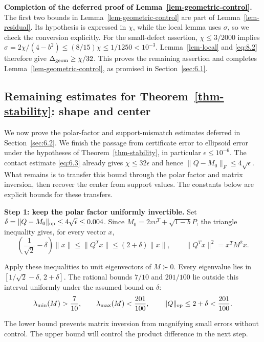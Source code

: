 \textbf{Completion of the deferred proof of Lemma~\ref{lem-geometric-control}.} The first two bounds in Lemma~\ref{lem-geometric-control}
are part of Lemma~\ref{lem-residual}. Its hypothesis is expressed in $\chi$, while the local
lemma uses $\sigma$, so we check the conversion explicitly. For the small-defect
assertion, $\chi\le3/2000$ implies
$\sigma=2\chi/(4-b^2)\le(8/15)\chi\le1/1250<10^{-3}$.
Lemma~\ref{lem-local} and \eqref{eq:8.2} therefore give $\Delta_{\rm geom}\ge\chi/32$.
This proves the remaining assertion and completes Lemma~\ref{lem-geometric-control}, as promised in Section~\ref{sec:6.1}.

\subsection{Remaining estimates for Theorem~\ref{thm-stability}: shape and center}\label{sec:9.4}

We now prove the polar-factor and support-mismatch estimates deferred in
Section~\ref{sec:6.2}. We finish the passage from certificate error to ellipsoid error under the
hypotheses of Theorem~\ref{thm-stability}, in particular $\epsilon\le10^{-6}$.
The contact estimate \eqref{eq:6.3} already gives $\chi\le32\epsilon$ and hence
$\|Q-M_0\|_F\le4\sqrt\epsilon$. What remains is to transfer this bound through
the polar factor and matrix inversion, then recover the center from support
values. The constants below are explicit bounds for these transfers.

\textbf{Step 1: keep the polar factor uniformly invertible.} Set
$\delta=\|Q-M_0\|_{\rm op}\le4\sqrt\epsilon\le0.004$. Since
$M_0=2vv^T+\sqrt{1-b}P$, the triangle inequality gives, for every vector $x$,
\begin{equation}\label{eq:9.14}
\left(\frac1{\sqrt2}-\delta\right)\|x\|
\le\|Q^Tx\|\le(2+\delta)\|x\|,
\qquad
\|Q^Tx\|^2=x^TM^2x.
\end{equation}

Apply these inequalities to unit eigenvectors of $M\succ0$. Every eigenvalue
lies in $[1/\sqrt2-\delta,\,2+\delta]$.
The rational bounds $7/10$ and $201/100$ lie outside this interval uniformly
under the assumed bound on $\delta$:
\begin{equation}\label{eq:9.15}
\lambda_{\min}(M)>\frac7{10},\qquad
\lambda_{\max}(M)<\frac{201}{100},\qquad
\|Q\|_{\rm op}\le2+\delta<\frac{201}{100}.
\end{equation}

The lower bound prevents matrix inversion from magnifying small errors
without control. The upper bound will control the product difference in the
next step.

